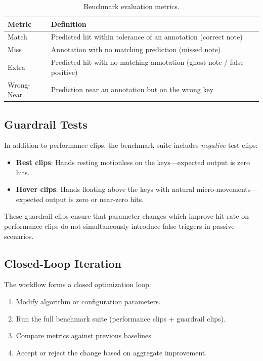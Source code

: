 \documentclass[11pt,a4paper]{article}
\begin{document}
\begin{table}[H]
    \centering
    \begin{tabular}{ll}
        \toprule
        \textbf{Metric} & \textbf{Definition} \\
        \midrule
        Match & Predicted hit within tolerance of an annotation (correct note) \\
        Miss & Annotation with no matching prediction (missed note) \\
        Extra & Predicted hit with no matching annotation (ghost note / false positive) \\
        Wrong-Near & Prediction near an annotation but on the wrong key \\
        \bottomrule
    \end{tabular}
    \caption{Benchmark evaluation metrics.}
    \label{tab:metrics}
\end{table}

\subsection{Guardrail Tests}

In addition to performance clips, the benchmark suite includes \emph{negative} test clips:
\begin{itemize}[nosep]
    \item \textbf{Rest clips}: Hands resting motionless on the keys---expected output is zero hits.
    \item \textbf{Hover clips}: Hands floating above the keys with natural micro-movements---expected output is zero or near-zero hits.
\end{itemize}

These guardrail clips ensure that parameter changes which improve hit rate on performance clips do not simultaneously introduce false triggers in passive scenarios.

\subsection{Closed-Loop Iteration}

The workflow forms a closed optimization loop:
\begin{enumerate}[nosep]
    \item Modify algorithm or configuration parameters.
    \item Run the full benchmark suite (performance clips + guardrail clips).
    \item Compare metrics against previous baselines.
    \item Accept or reject the change based on aggregate improvement.
\end{enumerate}
\end{document}
